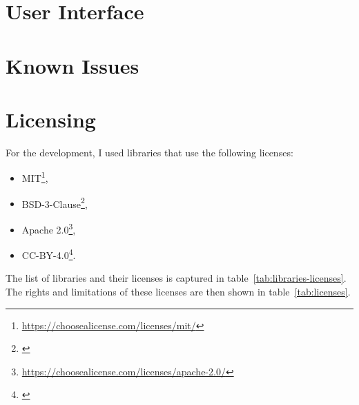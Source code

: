 \section{User Interface}
%


\section{Known Issues}


\section{Licensing}
For the development, I used libraries that use the following licenses:
\begin{itemize}
    \item MIT\footnote{\url{https://choosealicense.com/licenses/mit/}},
    \item BSD-3-Clause\footnote{\url{}},
    \item Apache 2.0\footnote{\url{https://choosealicense.com/licenses/apache-2.0/}},
    \item CC-BY-4.0\footnote{\url{}}.
\end{itemize}

The list of libraries and their licenses is captured in table~\ref{tab:libraries-licenses}.
The rights and limitations of these licenses are then shown in table~\ref{tab:licenses}.

